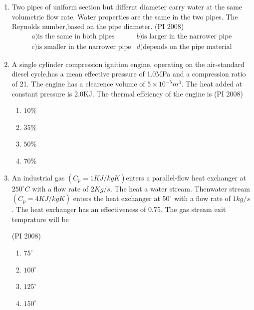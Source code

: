 \documentclass[journal,12pt,onecolumn]{IEEEtran}
\theoremstyle{remark}
\begin{document}
\begin{enumerate}
    \item %
    Two pipes of uniform section but differnt diameter carry  water at the same volumetric flow rate. Water properties are the same in the two pipes. The Reynolds number,based on the pipe diameter.
    \hfill{(PI 2008)}
    \[
    \begin{matrix}
        {a) \text{is the same in both pipes}  } & {b)\text{is larger in the narrower pipe}}\\
        {c)\text{is smaller in the narrower pipe}}  & {d)\text{depends on the pipe material}}
    \end{matrix}
    \]
    \vspace{1cm}
     \item %
     A single cylinder compression ignition engine, operating on the air-standard diesel cycle,has a mean effective pressure of 1.0MPa and a compression ratio of 21. The engine has a clearence volume of $5\times10^{-5}m^3$. The heat added at constant pressure is 2.0KJ. The thermal effciency of the engine is 
    \hfill{(PI 2008)}
    \begin{multicols}{4}
    \begin{enumerate}
        \item $10\%$
        \item $35\%$
        \item $50\%$
        \item $70\%$
    \end{enumerate}
\end{multicols}
\vspace{1cm}
 \item %
 An industrial gas $(C_p=1 KJ/kgK)$enters a parallel-flow heat exchanger at $250^{\circ}C$ with a flow rate of $2Kg/s$. The heat a water stream. Thenwater stream $(C_p=4KJ/kgK)$ enters the heat exchanger at  $50^{\circ}$ with a flow rate of $1kg/s$. The heat exchanger has an effectiveness of 0.75. The gas stream exit temprature will be 

    \hfill{(PI 2008)}
    \begin{multicols}{4}
    \begin{enumerate}
        \item  $75^{\circ}$
        \item  $100^{\circ}$

        \item  $125^{\circ}$

        \item  $150^{\circ}$


\end{enumerate}
\end{multicols}
\end{enumerate}
\end{document}
